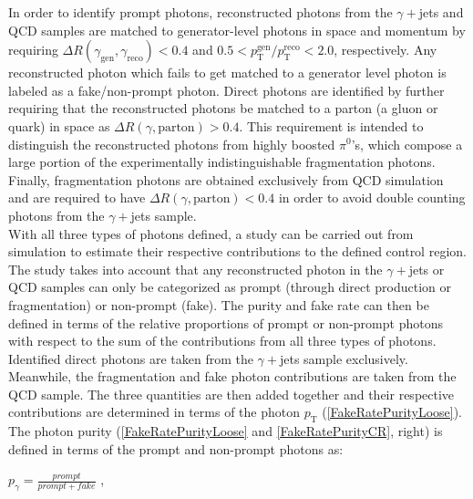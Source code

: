 In order to identify prompt photons, reconstructed photons from the $\gamma+$jets and QCD samples are matched to generator-level photons in space and momentum by requiring $\Delta R(\gamma_\text{gen},\gamma_\text{reco}) < 0.4$ and $0.5 < p_\text{T}^\text{gen}/p_\text{T}^\text{reco} < 2.0$, respectively. Any reconstructed photon which fails to get matched to a generator level photon is labeled as a fake/non-prompt photon. Direct photons are identified by further requiring that the reconstructed photons be matched to a parton (a gluon or quark) in space as $\Delta R(\gamma,\text{parton}) > 0.4$. This requirement is intended to distinguish the reconstructed photons from highly boosted $\pi^0$'s, which compose a large portion of the experimentally indistinguishable fragmentation photons. Finally, fragmentation photons are obtained exclusively from QCD simulation and are required to have $\Delta R(\gamma,\text{parton}) < 0.4$ in order to avoid double counting photons from the $\gamma+$jets sample.\\

With all three types of photons defined, a study can be carried out from simulation to estimate their respective contributions to the defined control region. The study takes into account that any reconstructed photon in the $\gamma+$jets or QCD samples can only be categorized as prompt (through direct production or fragmentation) or non-prompt (fake). The purity and fake rate can then be defined in terms of the relative proportions of prompt or non-prompt photons with respect to the sum of the contributions from all three types of photons. Identified direct photons are taken from the $\gamma+$jets sample exclusively. Meanwhile, the fragmentation and fake photon contributions are taken from the QCD sample. The three quantities are then added together and their respective contributions are determined in terms of the photon $p_\text{T}$ (\autoref{FakeRatePurityLoose}).\\

The photon purity (\autoref{FakeRatePurityLoose} and \autoref{FakeRatePurityCR}, right) is defined in terms of the prompt and non-prompt photons as:\\

\begingroup
	\large
	\begin{center}
		$p_\gamma = \frac{prompt}{prompt+fake}$ ,
	\end{center}
\endgroup
\vspace{1em}

